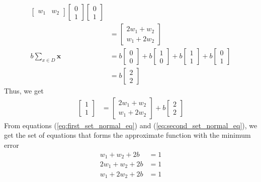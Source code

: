\begin{align}
\begin{bmatrix}
    w_1 & w_2
  \end{bmatrix} \begin{bmatrix}
    0 \\
    1
  \end{bmatrix} \begin{bmatrix}
    0 \\
    1
  \end{bmatrix} \\
  &= \begin{bmatrix}
    2w_1 + w_2 \\
    w_1 + 2w_2
  \end{bmatrix} \\
  \nonumber 
  b\sum_{x\in D}\textbf{x} &= 
    b\begin{bmatrix}
      0 \\
      0
    \end{bmatrix} + b\begin{bmatrix}
      1 \\
      0
    \end{bmatrix} + b\begin{bmatrix}
      1 \\
      1
    \end{bmatrix} + b\begin{bmatrix}
      0 \\
      1
    \end{bmatrix}\\
  &= b\begin{bmatrix}
    2 \\
    2
  \end{bmatrix}
\end{align}
Thus, we get
\begin{align}
  \label{eq:second_set_normal_eq}
\begin{bmatrix}
  1 \\
  1
\end{bmatrix}  &= \begin{bmatrix}
  2w_1 + w_2 \\
  w_1 + 2w_2
\end{bmatrix} + b\begin{bmatrix}
  2 \\
  2
\end{bmatrix}
\end{align}
From equations (\ref{eq:first_set_normal_eq}) and (\ref{eq:second_set_normal_eq}), we get the set of equations that forms the approximate function with the minimum error
\begin{align}
  w_1 + w_2 + 2b &= 1 \nonumber \\
  2w_1 + w_2 + 2b &= 1 \nonumber\\
  w_1 + 2w_2 + 2b &= 1 \nonumber
\end{align}
